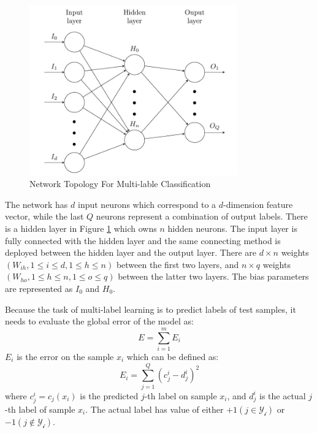 \graphicspath{ {./Figures/} }
\begin{figure}[!htb]
\centering
\includegraphics[width=0.8\textwidth]{MultiLabelNet.jpeg}
\caption{\label{fig:MultiLabelNet}Network Topology For Multi-lable Classification}
\end{figure}

The network has $d$ input neurons which correspond to a $d$-dimension feature vector, while the last $Q$ neurons represent a combination of output labels. There is a hidden layer in Figure \ref{fig:MultiLabelNet} which owns $n$ hidden neurons. The input layer is fully connected with the hidden layer and the same connecting method is deployed between the hidden layer and the output layer. There are $d \times n$ weights $(W_{ih}, 1 \leq i \leq d, 1 \leq h \leq n)$ between the first two layers, and $n \times q$ weights $(W_{ho}, 1 \leq h \leq n , 1 \leq o \leq q)$ between the latter two layers. The bias parameters are represented as $I_{0}$ and  $H_{0}$.

Because the task of multi-label learning is to predict labels of test samples, it needs to evaluate the global error of the model as:
\begin{equation}\label{eq:MultiLableError}
E = \sum_{i=1}^m E_{i}
\end{equation}
$E_{i}$ is the error on the sample $x_{i}$ which can be defined as:
\begin{equation}\label{eq:MultiLableSamError}
E_{i} = \sum_{j=1}^Q (c_{j}^i - d_{j}^i)^2
\end{equation}
where $c_{j}^i = c_{j}(x_{i})$ is the predicted $j$-th label on sample $x_{i}$, and $d_{j}^i$ is the actual $j$-th label of sample $x_{i}$. The actual label has value of either $+1 (j \in \mathcal{Y_{i}})$ or $-1 (j \notin \mathcal{Y_{i}})$.

